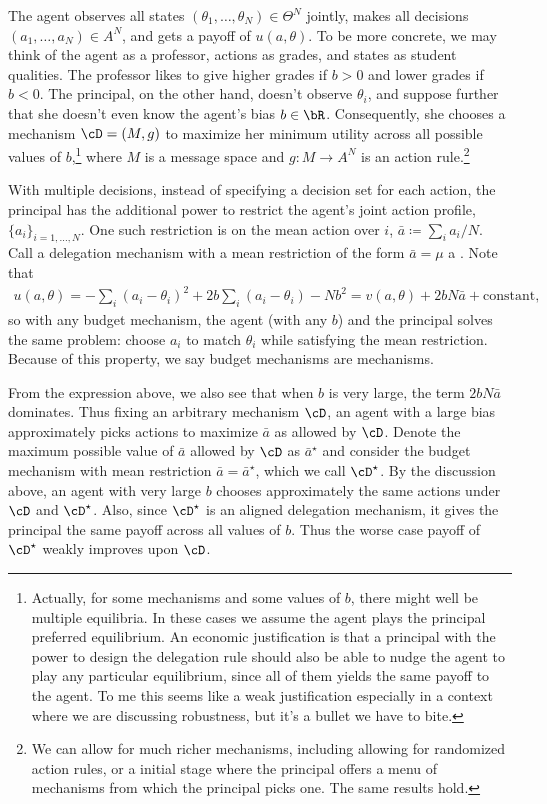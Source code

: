 The agent observes all states \((\theta_1, \dots, \theta_N) \in \Theta^N\) jointly, makes all decisions \((a_1, \dots, a_N) \in A^N\), and gets a payoff of \(u(a, \theta)\).
To be more concrete, we may think of the agent as a professor, actions as grades, and states as student qualities.
The professor likes to give higher grades if \(b > 0\) and lower grades if \(b < 0\).
The principal, on the other hand, doesn't observe \(\theta_i\), and suppose further that she doesn't even know the agent's bias \(b \in \bR\).
Consequently, she chooses a mechanism \(\cD = (M, g)\) to maximize her minimum utility across all possible values of \(b\),\footnote{Actually, for some mechanisms and some values of \(b\), there might well be multiple equilibria. In these cases we assume the agent plays the principal preferred equilibrium. An economic justification is that a principal with the power to design the delegation rule should also be able to nudge the agent to play any particular equilibrium, since all of them yields the same payoff to the agent. To me this seems like a weak justification especially in a context where we are discussing robustness, but it's a bullet we have to bite.} where \(M\) is a message space and \(g: M \to A^N\) is an action rule.\footnote{We can allow for much richer mechanisms, including allowing for randomized action rules, or a initial stage where the principal offers a menu of mechanisms from which the principal picks one. The same results hold.}

With multiple decisions, instead of specifying a decision set for each action, the principal has the additional power to restrict the agent's joint action profile, \(\{a_i\}_{i = 1, \dots, N}\).
One such restriction is on the mean action over \(i\), \(\bar{a} \coloneq \sum_i a_i / N\).
Call a delegation mechanism with a mean restriction of the form \(\bar{a} = \mu\) a .
Note that
\begin{align*}
  u(a, \theta)
  = -\sum_i (a_i - \theta_i)^2 + 2b \sum_i (a_i - \theta_i) - N b^2
  = v(a, \theta) + 2bN \bar{a} + \text{constant},
\end{align*}
so with any budget mechanism, the agent (with any \(b\)) and the principal solves the same problem: choose \(a_i\) to match \(\theta_i\) while satisfying the mean restriction.
Because of this property, we say budget mechanisms are  mechanisms.

From the expression above, we also see that when \(b\) is very large, the term \(2b N \bar{a}\) dominates.
Thus fixing an arbitrary mechanism \(\cD\), an agent with a large bias approximately picks actions to maximize \(\bar{a}\) as allowed by \(\cD\).
Denote the maximum possible value of \(\bar{a}\) allowed by \(\cD\) as \(\bar{a}^\star\) and consider the budget mechanism with mean restriction \(\bar{a} = \bar{a}^\star\), which we call \(\cD^\star\).
By the discussion above, an agent with very large \(b\) chooses approximately the same actions under \(\cD\) and \(\cD^\star\).
Also, since \(\cD^\star\) is an aligned delegation mechanism, it gives the principal the same payoff across all values of \(b\).
Thus the worse case payoff of \(\cD^\star\) weakly improves upon \(\cD\).

